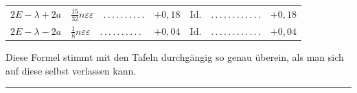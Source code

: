 \begin{landscape}
\begin{longtable}{r|p{7.8cm}r@{\quad}p{4.3cm}r}
\(2E-\lambda+2a\)&\(\tfrac{15}{32}n\varepsilon\varepsilon\quad \mathord{.}\,\mathord{.}\,\mathord{.}\,\mathord{.}\,\mathord{.}\,\mathord{.}\,\mathord{.}\,\mathord{.}\,\mathord{.}\,\mathord{.}\)&\(+0{,}18\)
&\(\text{Id.}\quad \mathord{.}\,\mathord{.}\,\mathord{.}\,\mathord{.}\,\mathord{.}\,\mathord{.}\,\mathord{.}\,\mathord{.}\,\mathord{.}\,\mathord{.}\,\mathord{.}\,\mathord{.}\)&\(+0{,}18\)\\
\(2E-\lambda-2a\)&\(\tfrac18n\varepsilon\varepsilon\quad \mathord{.}\,\mathord{.}\,\mathord{.}\,\mathord{.}\,\mathord{.}\,\mathord{.}\,\mathord{.}\,\mathord{.}\,\mathord{.}\,\mathord{.}\)&\(+0{,}04\)
&\(\text{Id.}\quad \mathord{.}\,\mathord{.}\,\mathord{.}\,\mathord{.}\,\mathord{.}\,\mathord{.}\,\mathord{.}\,\mathord{.}\,\mathord{.}\,\mathord{.}\,\mathord{.}\,\mathord{.}\)&\(+0{,}04\)
\end{longtable}
\endgroup
\end{landscape}
\par\noindent\hspace*{\parindent}Diese Formel stimmt mit den Tafeln durchgängig so genau überein, als
man sich auf diese selbst verlassen kann.
\begin{center}
\rule{3cm}{.4pt}
\end{center}
\clearpage
\endgroup
